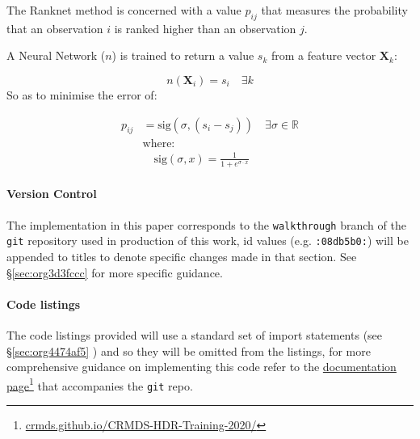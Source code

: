 \documentclass[a4paper,11pt,twoside]{article}
\begin{document}
The Ranknet method is concerned with a value \(p_{ij}\) that
measures the probability that an observation \(i\) is ranked higher
than an observation \(j\).

A Neural Network (\(n\)) is trained to return a value
\(s_k\) from a feature vector \(\mathbf{X}_k\):

 \[n(\mathbf{X}_i) = s_i \quad \exists k\]
So as to minimise the error of:




\begin{align} 
 p_{ij} &= \mathrm{sig}\left(\sigma, (s_i-s_j) \right) \quad \exists \sigma \in \mathbb{R} \\
 &\text{where:} \nonumber \\
 &\quad  \mathrm{sig}\left(\sigma, x\right) = \frac{1}{1+e^{\sigma \cdot x}} 
\end{align} 



\paragraph{Version Control}
\label{sec:orge55bf9d}
The implementation in this paper corresponds to the \texttt{walkthrough} branch
of the \texttt{git} repository used in production of this work, id values
(e.g. \texttt{:08db5b0:}) will be appended to titles to denote specific
changes made in that section. See \S \ref{sec:org3d3fccc} for
more specific guidance.

\paragraph{Code listings}
\label{sec:org6e8c215}
The code listings provided will use a standard set of import
statements (see \S \ref{sec:org4474af5} ) and so they will be
omitted from the listings, for more comprehensive guidance on
implementing this code refer to the \href{https://crmds.github.io/CRMDS-HDR-Training-2020/}{documentation page}\footnote{\href{https://crmds.github.io/CRMDS-HDR-Training-2020/}{crmds.github.io/CRMDS-HDR-Training-2020/}} that
accompanies the \texttt{git} repo.
\end{document}
